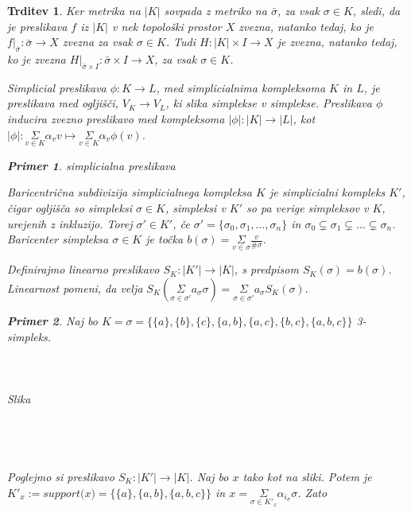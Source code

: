 \documentclass[a4paper,12pt]{article}
\DeclareRobustCommand{\si}{
    \bar{\sigma}
}
\theoremstyle{definition}
\theoremstyle{plain}
\theoremstyle{definition}
\newtheorem{primer}{Primer}
\theoremstyle{plain}
\newtheorem{trditev}{Trditev}
\theoremstyle{plain}
\theoremstyle{plain}
\theoremstyle{plain}
\begin{document}
\begin{trditev}
Ker metrika na $|K|$ sovpada z metriko na $\bar{\sigma}$, za vsak $\sigma\in K$, sledi, da je preslikava $f$ iz $|K|$ v nek topološki prostor $X$ zvezna, natanko tedaj, ko je $f|_{\bar{\sigma}}: \bar{\sigma} \rightarrow X$ zvezna za vsak $\sigma\in K$. Tudi $H:|K|\times I \rightarrow X$ je zvezna, natanko tedaj, ko je zvezna $H|_{\si\times I}:\si\times I \rightarrow X$, za vsak $\sigma\in K$.


\textit{Simplicial preslikava} $\phi :K \rightarrow L$, med 
simplicialnima kompleksoma $K$ in $L$, je preslikava med 
ogljišči, $V_K \rightarrow V_L$, ki slika simplekse v 
simplekse. Preslikava $\phi$ inducira zvezno preslikavo med 
kompleksoma $|\phi| :|K| \rightarrow |L|$, kot $|\phi|:
\underset{v \in K}{\Sigma}\alpha_v v \mapsto
\underset{v \in K}{\Sigma}\alpha_v \phi(v)$.

\begin{primer}
    simplicialna preslikava
\end{primer}
    
\textit{Baricentrična subdivizija} simplicialnega kompleksa 
$K$ je simplicialni kompleks $K'$, čigar ogljišča so 
simpleksi $\sigma \in K$, simpleksi v $K'$ so pa verige 
simpleksov v $K$, urejenih z inkluzijo. Torej $\sigma' \in K'$, če $\sigma' = \{\sigma_0, \sigma_1,...,\sigma_n\}$ in $\sigma_0\subsetneq \sigma_1\subsetneq...\subsetneq\sigma_n$. \textit{Baricenter} simpleksa $\sigma \in K$ je točka $b(\sigma)=\underset{v\in \sigma}{\Sigma} \frac{v}{\#\sigma}$.

Definirajmo linearno preslikavo $S_K: |K'| \rightarrow |K|$, s predpisom $S_K(\sigma) = b(\sigma)$. Linearnost pomeni, da velja $S_K(\underset{\sigma\in \sigma'}{\Sigma} a_\sigma \sigma) =  \underset{\sigma\in \sigma'}{\Sigma} a_\sigma S_K(\sigma).$

\begin{primer}
Naj bo $K=\sigma=\{\{a\},\{b\},\{c\},\{a,b\},\{a,c\},\{b,c\},\{a,b,c\}\}$ 3-simpleks.
\\
\\
\\
\\
Slika
\\
\\
\\
\\
\\
Poglejmo si preslikavo $S_K: |K'| \rightarrow |K|$. Naj bo $x$ tako kot na sliki. %
Potem je 
$K'_x:=\textit{support(x)}=\{\{a\},\{a,b\},\{a,b,c\}\}$ in $x= \underset{\sigma\in K'_x}{\Sigma} \alpha_{i_\sigma} \sigma$. Zato


\end{primer}
\end{trditev}
\end{document}
